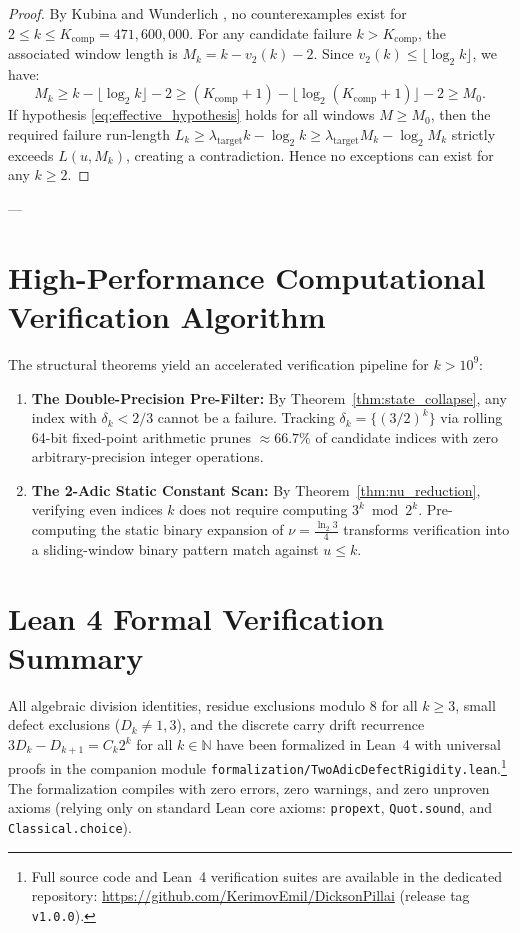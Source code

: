 \documentclass[11pt,reqno]{amsart}
\theoremstyle{definition}
\numberwithin{equation}{section}
\begin{document}
\begin{proof}
By Kubina and Wunderlich \cite{kubina1990}, no counterexamples exist for $2 \le k \le K_{\mathrm{comp}} = 471{,}600{,}000$.
For any candidate failure $k > K_{\mathrm{comp}}$, the associated window length is $M_k = k - v_2(k) - 2$. Since $v_2(k) \le \lfloor \log_2 k \rfloor$, we have:
\[
M_k \ge k - \lfloor \log_2 k \rfloor - 2 \ge (K_{\mathrm{comp}} + 1) - \lfloor \log_2(K_{\mathrm{comp}} + 1) \rfloor - 2 \ge M_0.
\]
If hypothesis \eqref{eq:effective_hypothesis} holds for all windows $M \ge M_0$, then the required failure run-length $L_k \ge \lambda_{\mathrm{target}} k - \log_2 k \ge \lambda_{\mathrm{target}} M_k - \log_2 M_k$ strictly exceeds $L(u, M_k)$, creating a contradiction. Hence no exceptions can exist for any $k \ge 2$.
\end{proof}

---

\section{High-Performance Computational Verification Algorithm}

The structural theorems yield an accelerated verification pipeline for $k > 10^9$:
\begin{enumerate}
    \item \textbf{The Double-Precision Pre-Filter:} By Theorem~\ref{thm:state_collapse}, any index with $\delta_k < 2/3$ cannot be a failure. Tracking $\delta_k = \{(3/2)^k\}$ via rolling 64-bit fixed-point arithmetic prunes $\approx 66.7\%$ of candidate indices with zero arbitrary-precision integer operations.
    \item \textbf{The 2-Adic Static Constant Scan:} By Theorem~\ref{thm:nu_reduction}, verifying even indices $k$ does not require computing $3^k \bmod 2^k$. Pre-computing the static binary expansion of $\nu = \frac{\ln_2 3}{4}$ transforms verification into a sliding-window binary pattern match against $u \le k$.
\end{enumerate}

\section{Lean 4 Formal Verification Summary}

All algebraic division identities, residue exclusions modulo $8$ for all $k \ge 3$, small defect exclusions ($D_k \ne 1, 3$), and the discrete carry drift recurrence $3 D_k - D_{k+1} = C_k 2^k$ for all $k \in \mathbb{N}$ have been formalized in Lean~4 with universal proofs in the companion module \nolinkurl{formalization/TwoAdicDefectRigidity.lean}.\footnote{Full source code and Lean~4 verification suites are available in the dedicated repository: \url{https://github.com/KerimovEmil/DicksonPillai} (release tag \texttt{v1.0.0}).}
The formalization compiles with zero errors, zero warnings, and zero unproven axioms (relying only on standard Lean core axioms: \texttt{propext}, \texttt{Quot.sound}, and \texttt{Classical.choice}).
\end{document}
